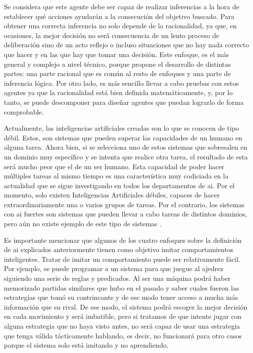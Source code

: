 \begin{enumerate}
Se considera que este agente debe ser capaz de realizar inferencias a la hora de establecer qué acciones ayudarán a la consecución del objetivo buscado. Para obtener una correcta inferencia no solo depende de la racionalidad, ya que, en ocasiones, la mejor decisión no será consecuencia de un lento proceso de deliberación sino de un acto reflejo o incluso situaciones que no hay nada correcto que hacer y en las que hay que tomar una decisión. Este enfoque, es el más general y complejo a nivel técnico, porque propone el desarrollo de distintas partes: una parte racional que es común al resto de enfoques y una parte de inferencia lógica. Por otro lado, es más sencillo llevar a cabo pruebas con estos agentes ya que la racionalidad está bien definida matemáticamente, y, por lo tanto, se puede descomponer para diseñar agentes que puedan lograrlo de forma comprobable.  \cite{amodernapproach}
\end{enumerate}


Actualmente, las inteligencias artificiales creadas son lo que se conocen de tipo débil. Estos, son sistemas que pueden superar las capacidades de un humano en alguna tarea. Ahora bien, si se selecciona uno de estos sistemas que sobresalen en un dominio muy específico y se intenta que realice otra tarea, el resultado de esta será mucho peor que el de un ser humano. Esta capacidad de poder hacer múltiples tareas al mismo tiempo es una característica muy codiciada en la actualidad que se sigue investigando en todos los departamentos de \acrshort{ai}. Por el momento, solo existen Inteligencias Artificiales débiles, capaces de hacer extraordinariamente una o varios grupos de tareas. Por el contrario, los sistemas con \acrshort{ai} fuertes son sistemas que pueden llevar a cabo tareas de distintos dominios, pero aún no existe ejemplo de este tipo de sistemas \cite{amodernapproach}.
\newline

Es importante mencionar que algunos de los cuatro enfoques sobre la definición de \acrshort{ai} explicados anteriormente tienen como objetivo imitar comportamientos inteligentes. Tratar de imitar un comportamiento puede ser relativamente fácil. Por ejemplo, se puede programar a un sistema para que juegue al ajedrez siguiendo una serie de reglas y predicados. Al ser una máquina podrá haber memorizado partidas similares que hubo en el pasado y saber cuales fueron las estrategias que tomó su contrincante y de ese modo tener acceso a mucha más información que su rival. De ese modo, el sistema podrá escoger la mejor decisión en cada movimiento y será imbatible, pero si tratamos de que intente jugar con alguna estrategia que no haya visto antes, no será capaz de usar una estrategia que tenga válida tácticamente hablando, es decir, no funcionará para otro casos porque el sistema solo está imitando y no aprendiendo.
\newline

